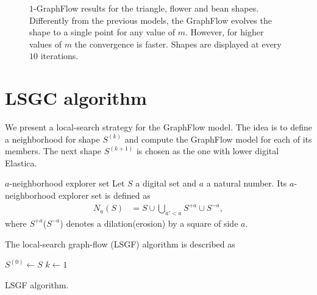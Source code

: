 \begin{figure}
\begin{tabular}{cccc}
\end{tabular}
\caption{$1$-GraphFlow results for the triangle, flower and bean shapes. Differently from the previous models, the GraphFlow evolves the shape to a single point for any value of $m$. However, for higher values of $m$ the convergence is faster. Shapes are displayed at every $10$ iterations.}
\label{fig:graph-flow-neigh0-results}
\end{figure}

\section{LSGC algorithm}
	We present a local-search strategy for the GraphFlow model. The idea is to define a neighborhood for shape $S^{(k)}$ and compute the GraphFlow model for each of its members. The next shape $S^{(k+1)}$ is chosen as the one with lower digital Elastica.

\begin{definition}{$a$-neighborhood explorer set}
	Let $S$ a digital set and $a$ a natural number. Its $a$-neighborhood explorer set is defined as
	\begin{align*}
		N_a(S) &= S \cup \bigcup_{a' < a}{S^{+a} \cup S^{-a}},
	\end{align*}
	where $S^{+a}$($S^{-a}$) denotes a dilation(erosion) by a square of side $a$.
\end{definition}

The local-search graph-flow (LSGF) algorithm is described as


\begin{algorithm}
 
 \BlankLine
 $S^{(0)} \longleftarrow S$\;
 $k \longleftarrow 1$\;
 \caption{LSGF algorithm.}
 \label{alg:legc-algorithm}  
\end{algorithm}

